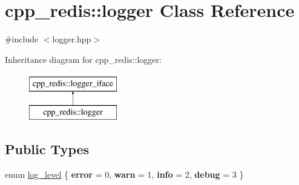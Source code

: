 \hypertarget{classcpp__redis_1_1logger}{}\section{cpp\+\_\+redis\+:\+:logger Class Reference}
\label{classcpp__redis_1_1logger}


{\ttfamily \#include $<$logger.\+hpp$>$}

Inheritance diagram for cpp\+\_\+redis\+:\+:logger\+:\begin{figure}[H]
\begin{center}
\leavevmode
\includegraphics[height=2.000000cm]{classcpp__redis_1_1logger}
\end{center}
\end{figure}
\subsection*{Public Types}
\begin{DoxyCompactItemize}
\item 
enum \hyperlink{classcpp__redis_1_1logger_a9493594d547e7abe71b8690be1946c7a}{log\+\_\+level} \{ {\bfseries error} = 0, 
{\bfseries warn} = 1, 
{\bfseries info} = 2, 
{\bfseries debug} = 3
 \}
\end{DoxyCompactItemize}
